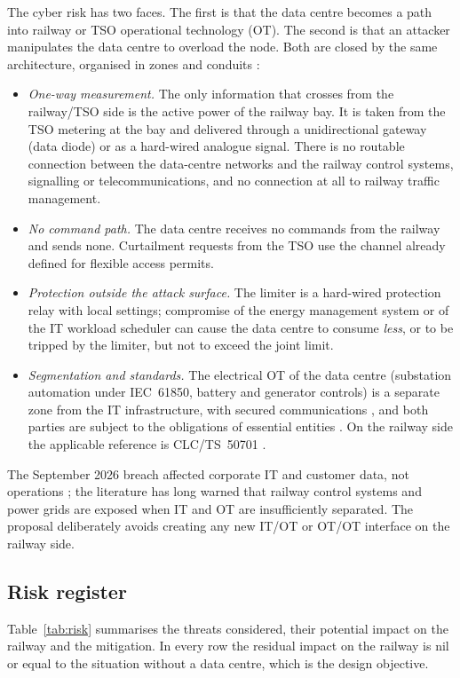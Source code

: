The cyber risk has two faces. The first is that the data centre becomes a path into railway or TSO operational technology (OT). The second is that an attacker manipulates the data centre to overload the node. Both are closed by the same architecture, organised in zones and conduits \cite{iec62443}:
\begin{itemize}
\item \emph{One-way measurement.} The only information that crosses from the railway/TSO side is the active power of the railway bay. It is taken from the TSO metering at the bay and delivered through a unidirectional gateway (data diode) or as a hard-wired analogue signal. There is no routable connection between the data-centre networks and the railway control systems, signalling or telecommunications, and no connection at all to railway traffic management.
\item \emph{No command path.} The data centre receives no commands from the railway and sends none. Curtailment requests from the TSO use the channel already defined for flexible access permits.
\item \emph{Protection outside the attack surface.} The limiter is a hard-wired protection relay with local settings; compromise of the energy management system or of the IT workload scheduler can cause the data centre to consume \emph{less}, or to be tripped by the limiter, but not to exceed the joint limit.
\item \emph{Segmentation and standards.} The electrical OT of the data centre (substation automation under IEC~61850, battery and generator controls) is a separate zone from the IT infrastructure, with secured communications \cite{iec62351}, and both parties are subject to the obligations of essential entities \cite{nis2,ens2022}. On the railway side the applicable reference is CLC/TS~50701 \cite{ts50701}.
\end{itemize}
The September 2026 breach affected corporate IT and customer data, not operations \cite{cyber2026}; the literature has long warned that railway control systems \cite{lopez2015,kour2020} and power grids \cite{sun2018} are exposed when IT and OT are insufficiently separated. The proposal deliberately avoids creating any new IT/OT or OT/OT interface on the railway side.

\subsection{Risk register}

Table~\ref{tab:risk} summarises the threats considered, their potential impact on the railway and the mitigation. In every row the residual impact on the railway is nil or equal to the situation without a data centre, which is the design objective.

